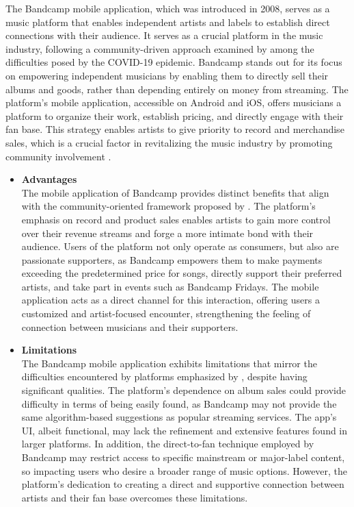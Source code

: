 The Bandcamp mobile application, which was introduced in 2008, serves as a music platform that enables independent artists and labels to establish direct connections with their audience. It serves as a crucial platform in the music industry, following a community-driven approach examined by \textcite{leger21} among the difficulties posed by the COVID-19 epidemic. Bandcamp stands out for its focus on empowering independent musicians by enabling them to directly sell their albums and goods, rather than depending entirely on money from streaming. The platform's mobile application, accessible on Android and iOS, offers musicians a platform to organize their work, establish pricing, and directly engage with their fan base. This strategy enables artists to give priority to record and merchandise sales, which is a crucial factor in revitalizing the music industry by promoting community involvement \parencite{leger21}. \pagebreak
\begin{itemize}[\label{}]
    \item \textbf{Advantages} \\
    The mobile application of Bandcamp provides distinct benefits that align with the community-oriented framework proposed by \textcite{leger21}. The platform's emphasis on record and product sales enables artists to gain more control over their revenue streams and forge a more intimate bond with their audience. Users of the platform not only operate as consumers, but also are passionate supporters, as Bandcamp empowers them to make payments exceeding the predetermined price for songs, directly support their preferred artists, and take part in events such as Bandcamp Fridays. The mobile application acts as a direct channel for this interaction, offering users a customized and artist-focused encounter, strengthening the feeling of connection between musicians and their supporters.
    \item \textbf{Limitations} \\
    The Bandcamp mobile application exhibits limitations that mirror the difficulties encountered by platforms emphasized by \textcite{leger21}, despite having significant qualities. The platform's dependence on album sales could provide difficulty in terms of being easily found, as Bandcamp may not provide the same algorithm-based suggestions as popular streaming services. The app's UI, albeit functional, may lack the refinement and extensive features found in larger platforms. In addition, the direct-to-fan technique employed by Bandcamp may restrict access to specific mainstream or major-label content, so impacting users who desire a broader range of music options. However, the platform's dedication to creating a direct and supportive connection between artists and their fan base overcomes these limitations.
\end{itemize}
\pagebreak

